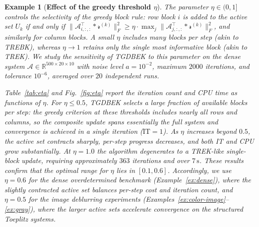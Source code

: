 \documentclass[11pt]{article}
\newtheorem{example}[theorem]{Example}
\def\fm#1{\mathcal{#1}}
\begin{document}
\begin{example}[\textbf{Effect of the greedy threshold $\eta$}] \label{ex:eta}
The parameter $\eta \in (0,1]$ controls the selectivity of the greedy block rule: row block $i$ is added to the active set $U_k$ if and only if $\|\fm A_{i,:,:}^\top * \fm r^{(k)}\|_F^2 \geq \eta \cdot \max_j \|\fm A_{j,:,:}^\top * \fm r^{(k)}\|_F^2$, and similarly for column blocks. A small $\eta$ includes many blocks per step (akin to TREBK), whereas $\eta \to 1$ retains only the single most informative block (akin to TREK). We study the sensitivity of TGDBEK to this parameter on the dense system $\fm A \in \mathbb{R}^{500\times20\times10}$ with noise level $a=10^{-2}$, maximum $2000$ iterations, and tolerance $10^{-6}$, averaged over $20$ independent runs.

Table~\ref{tab:eta} and Fig.~\ref{fig:eta} report the iteration count and CPU time as functions of $\eta$. For $\eta \leq 0.5$, TGDBEK selects a large fraction of available blocks per step: the greedy criterion at these thresholds includes nearly all rows and columns, so the composite update spans essentially the full system and convergence is achieved in a single iteration ($\mathrm{IT}=1$). As $\eta$ increases beyond $0.5$, the active set contracts sharply, per-step progress decreases, and both IT and CPU grow substantially. At $\eta = 1.0$ the algorithm degenerates to a TREK-like single-block update, requiring approximately $363$ iterations and over $7\,\mathrm{s}$. These results confirm that the optimal range for $\eta$ lies in $[0.1, 0.6]$. Accordingly, we use $\eta = 0.6$ for the dense overdetermined benchmark (Example~\ref{ex:dense}), where the slightly contracted active set balances per-step cost and iteration count, and $\eta = 0.5$ for the image deblurring experiments (Examples~\ref{ex:color-image}--\ref{ex:gray}), where the larger active sets accelerate convergence on the structured Toeplitz systems.


\end{example}
\end{document}
